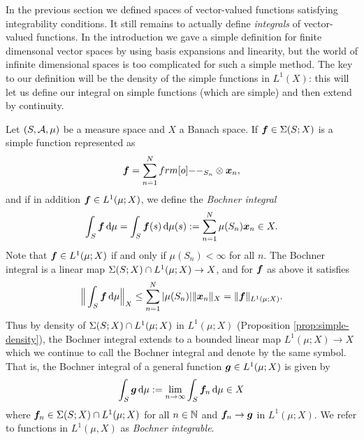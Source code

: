 In the previous section we defined spaces of vector-valued functions satisfying integrability conditions.
It still remains to actually define \emph{integrals} of vector-valued functions.
In the introduction we gave a simple definition for finite dimensonal vector spaces by using basis expansions and linearity, but the world of infinite dimensional spaces is too complicated for such a simple method.
The key to our definition will be the density of the simple functions in $L^1(X)$: this will let us define our integral on simple functions (which are simple) and then extend by continuity.

Let $(S,\mathcal{A},\mu)$ be a measure space and $X$ a Banach space.
If $\bm{f} \in \Sigma(S;X)$ is a simple function represented as
\begin{equation*}
  \mb{f} = \sum_{n=1}^N \1_{S_n} \otimes \mb{x}_n ,
\end{equation*}
and if in addition $\bm{f} \in L^1(\mu;X)$, we define the \emph{Bochner integral}
\begin{equation*}
  \int_S \bm{f} \, \mathrm{d}\mu = \int_S \bm{f}(s) \, \mathrm{d} \mu(s) := \sum_{n=1}^N \mu(S_n) \bm{x}_n \in X.
\end{equation*}
Note that $\bm{f} \in L^1(\mu;X)$ if and only if $\mu(S_n) < \infty$ for all $n$.
The Bochner integral is a linear map $\Sigma(S;X) \cap L^1(\mu;X) \to X$, and for $\bm{f}$ as above it satisfies
\begin{equation*}
  \Big\| \int_S \bm{f} \, \mathrm{d} \mu \Big\|_X \leq \sum_{n=1}^{N} |\mu(S_n)| \|\bm{x}_n\|_X = \|\bm{f}\|_{L^1(\mu;X)}.
\end{equation*}
Thus by density of $\Sigma(S;X) \cap L^1(\mu;X)$ in $L^1(\mu;X)$ (Proposition \ref{prop:simple-density}), the Bochner integral extends to a bounded linear map $L^1(\mu;X) \to X$ which we continue to call the Bochner integral and denote by the same symbol.
That is, the Bochner integral of a general function $\bm{g} \in L^1(\mu;X)$ is given by 
\begin{equation*}
  \int_S \bm{g} \, \mathrm{d}\mu := \lim_{n \to \infty} \int_S \bm{f}_n \, \mathrm{d}\mu \in X
\end{equation*}
where $\bm{f}_n \in \Sigma(S;X) \cap L^1(\mu;X)$ for all $n \in \mathbb{N}$ and $\bm{f}_n \to \bm{g}$ in $L^1(\mu;X)$.
We refer to functions in $L^1(\mu,X)$ as \emph{Bochner integrable}.

